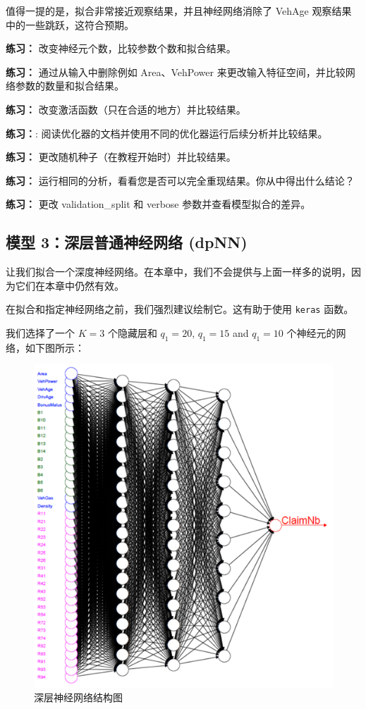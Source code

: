 \documentclass[
]{article}
\begin{document}
值得一提的是，拟合非常接近观察结果，并且神经网络消除了 VehAge
观察结果中的一些跳跃，这符合预期。

\textbf{练习：} 改变神经元个数，比较参数个数和拟合结果。

\textbf{练习：} 通过从输入中删除例如 Area、VehPower
来更改输入特征空间，并比较网络参数的数量和拟合结果。

\textbf{练习：} 改变激活函数（只在合适的地方）并比较结果。

\textbf{练习：}:
阅读优化器的文档并使用不同的优化器运行后续分析并比较结果。

\textbf{练习：} 更改随机种子（在教程开始时）并比较结果。

\textbf{练习：}
运行相同的分析，看看您是否可以完全重现结果。你从中得出什么结论？

\textbf{练习：} 更改 validation\_split 和 verbose
参数并查看模型拟合的差异。

\subsection{模型 3：深层普通神经网络
(dpNN)}\label{ux6a21ux578b-3ux6df1ux5c42ux666eux901aux795eux7ecfux7f51ux7edc-dpnn}

让我们拟合一个深度神经网络。在本章中，我们不会提供与上面一样多的说明，因为它们在本章中仍然有效。

在拟合和指定神经网络之前，我们强烈建议绘制它。这有助于使用
\texttt{keras} 函数。

我们选择了一个 \(K=3\) 个隐藏层和 \(q_1=20\), \(q_1=15\) and \(q_1=10\)
个神经元的网络，如下图所示：

\begin{figure}
\centering
\includegraphics{./Figs/Case2/Case2-Fig5.png}
\caption{深层神经网络结构图}
\end{figure}
\end{document}

